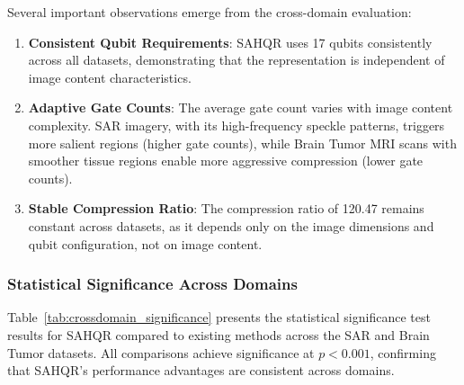 \documentclass[pdflatex,sn-mathphys-num,Numbered]{sn-jnl}
\theoremstyle{thmstyleone}
\theoremstyle{thmstyletwo}
\theoremstyle{thmstylethree}
\begin{document}
Several important observations emerge from the cross-domain evaluation:

\begin{enumerate}
\item \textbf{Consistent Qubit Requirements}: SAHQR uses 17 qubits consistently across all datasets, demonstrating that the representation is independent of image content characteristics.

\item \textbf{Adaptive Gate Counts}: The average gate count varies with image content complexity. SAR imagery, with its high-frequency speckle patterns, triggers more salient regions (higher gate counts), while Brain Tumor MRI scans with smoother tissue regions enable more aggressive compression (lower gate counts).

\item \textbf{Stable Compression Ratio}: The compression ratio of 120.47 remains constant across datasets, as it depends only on the image dimensions and qubit configuration, not on image content.
\end{enumerate}

\subsubsection{Statistical Significance Across Domains}

Table~\ref{tab:crossdomain_significance} presents the statistical significance test results for SAHQR compared to existing methods across the SAR and Brain Tumor datasets. All comparisons achieve significance at $p < 0.001$, confirming that SAHQR's performance advantages are consistent across domains.
\end{document}
